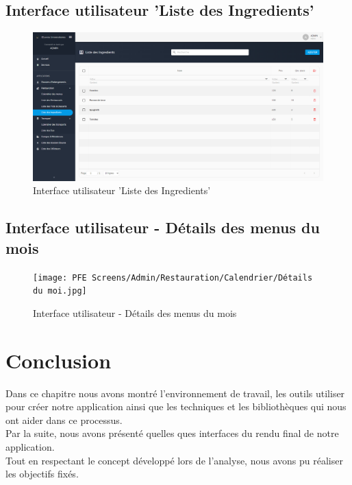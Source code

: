     \subsection{Interface utilisateur 'Liste des Ingredients'}
    \begin{figure}[H]
        \centering
        \includegraphics[scale=0.21]{PFE Screens/Admin/Restauration/Ingredients/liste.jpg}
        \caption{Interface utilisateur 'Liste des Ingredients'}
    \end{figure}
    
    \subsection{Interface utilisateur - Détails des menus du mois}
    \begin{figure}[H]
        \centering
        \texttt{[image: PFE Screens/Admin/Restauration/Calendrier/Détails du moi.jpg]}
        \caption{Interface utilisateur - Détails des menus du mois}
    \end{figure}

\section{Conclusion}
Dans ce chapitre nous avons montré l'environnement de travail, les outils utiliser pour créer notre application ainsi que les techniques et les bibliothèques qui nous ont aider dans ce processus.\\

Par la suite, nous avons présenté quelles ques interfaces du rendu final de notre application.\\

Tout en respectant le concept développé lors de l'analyse, nous avons pu réaliser les objectifs fixés.\\